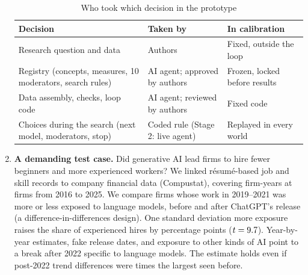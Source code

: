 \documentclass[11pt]{article}
\begin{document}
\begin{enumerate}
\begin{table}[t]\centering\footnotesize
\caption{Who took which decision in the prototype}\label{tab:ledger}
\setlength{\tabcolsep}{5pt}\begin{tabular}{lll}
\toprule
Decision & Taken by & In calibration \\
\midrule
Research question and data & Authors & Fixed, outside the loop \\
Registry (concepts, measures, 10 moderators, search rules) & AI agent; approved by authors & Frozen, locked before results \\
Data assembly, checks, loop code & AI agent; reviewed by authors & Fixed code \\
Choices during the search (next model, moderators, stop) & Coded rule (Stage 2: live agent) & Replayed in every world \\
\bottomrule
\end{tabular}
\end{table}

\item \textbf{A demanding test case.} Did generative AI lead firms to hire fewer beginners and more experienced workers?
We linked r\'esum\'e-based job and skill records to company financial data (Compustat), covering \NfirmYears firm-years at
\Nfirms firms from 2016 to 2025. We compare firms whose work in 2019--2021 was more or less exposed to language models, before and after
ChatGPT's release (a difference-in-differences design). One standard deviation more exposure
raises the share of experienced hires by \HoneB percentage points ($t=9.7$). Year-by-year estimates, fake release
dates, and exposure to other kinds of AI point to a break after 2022 specific to language models. The estimate holds even if
post-2022 trend differences were \Mbar times the largest seen before.


\end{enumerate}
\end{document}
